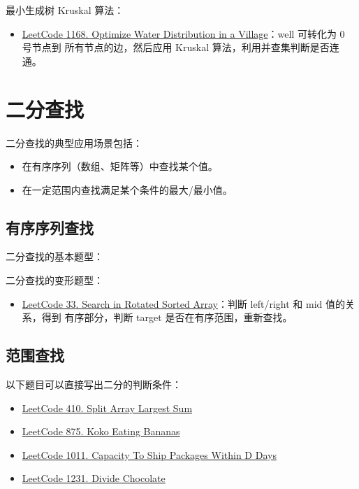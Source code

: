 最小生成树 Kruskal 算法：
\begin{itemize}
  \item
    \href{https://leetcode.com/problems/optimize-water-distribution-in-a-village}{LeetCode
      1168. Optimize Water Distribution in a Village}：well 可转化为 0 号节点到
    所有节点的边，然后应用 Kruskal 算法，利用并查集判断是否连通。
\end{itemize}

\section{二分查找}
二分查找的典型应用场景包括：

\begin{itemize}
  \item 在有序序列（数组、矩阵等）中查找某个值。
  \item 在一定范围内查找满足某个条件的最大/最小值。
\end{itemize}

\subsection{有序序列查找}
二分查找的基本题型：

二分查找的变形题型：
\begin{itemize}
  \item
    \href{https://leetcode.com/problems/search-in-rotated-sorted-array/}{LeetCode
      33. Search in Rotated Sorted Array}：判断 left/right 和 mid 值的关系，得到
    有序部分，判断 target 是否在有序范围，重新查找。
\end{itemize}

\subsection{范围查找}
以下题目可以直接写出二分的判断条件：

\begin{itemize}
  \label{lc:bs-range-general}
  \item
    \href{https://leetcode.com/problems/split-array-largest-sum/}{LeetCode 410. Split Array Largest Sum}
  \item
    \href{https://leetcode.com/problems/koko-eating-bananas/}{LeetCode 875. Koko Eating Bananas}
  \item
    \href{https://leetcode.com/problems/capacity-to-ship-packages-within-d-days/}{LeetCode
      1011. Capacity To Ship Packages Within D Days}
  \item
    \href{https://leetcode.com/problems/divide-chocolate}{LeetCode 1231. Divide Chocolate}
\end{itemize}

